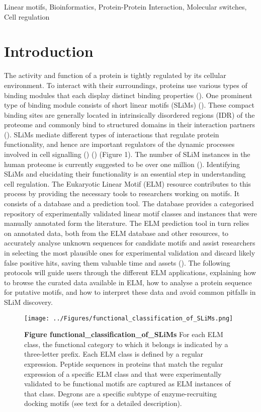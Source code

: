 Linear motifs, Bioinformatics, Protein-Protein Interaction, Molecular
switches, Cell regulation

\section{Introduction}\label{introduction}

The activity and function of a protein is tightly regulated by its
cellular environment. To interact with their surroundings, proteins use
various types of binding modules that each display distinct binding
properties (\cite{10550212}). One prominent type of binding module
consists of short linear motifs (SLiMs) (\cite{18508681}). These compact
binding sites are generally located in intrinsically disordered regions
(IDR) of the proteome and commonly bind to structured domains in their
interaction partners (\cite{21909575}). SLiMs mediate different types of
interactions that regulate protein functionality, and hence are
important regulators of the dynamic processes involved in cell
signalling (\cite{22480932}) (\cite{24926813}) (Figure 1). The number of
SLiM instances in the human proteome is currently suggested to be over
one million (\cite{25038412}). Identifying SLiMs and elucidating their
functionality is an essential step in understanding cell regulation. The
Eukaryotic Linear Motif (ELM) resource contributes to this process by
providing the necessary tools to researchers working on motifs. It
consists of a database and a prediction tool. The database provides a
categorised repository of experimentally validated linear motif classes
and instances that were manually annotated form the literature. The ELM
prediction tool in turn relies on annotated data, both from the ELM
database and other resources, to accurately analyse unknown sequences
for candidate motifs and assist researchers in selecting the most
plausible ones for experimental validation and discard likely false
positive hits, saving them valuable time and assets (\cite{22110040}).
The following protocols will guide users through the different ELM
applications, explaining how to browse the curated data available in
ELM, how to analyse a protein sequence for putative motifs, and how to
interpret these data and avoid common pitfalls in SLiM discovery.

\begin{figure}[h!]
\centering
\texttt{[image: ../Figures/functional\_classification\_of\_SLiMs.png]}
\caption{
\textbf{Figure functional\_classification\_of\_SLiMs} For each ELM
class, the functional category to which it belongs is indicated by a
three-letter prefix. Each ELM class is defined by a regular expression.
Peptide sequences in proteins that match the regular expression of a
specific ELM class and that were experimentally validated to be
functional motifs are captured as ELM instances of that class. Degrons
are a specific subtype of enzyme-recruiting docking motifs (see text for
a detailed description).
}
\end{figure}

